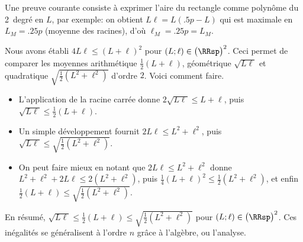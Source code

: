 

\begin{remark}
	Une preuve courante consiste à exprimer l'aire du rectangle comme polynôme du 2\ieme\ degré en $L$, par exemple: on obtient $L \ell = L (\num{.5} p - L)$ qui est maximale en $L_M = \num{.25} p$ (moyenne des racines), d'où $\ell_M = \num{.25} p = L_M$.
\end{remark}




\begin{remark} \label{ineq-geo-quad-arith}
	Nous avons établi
	$4 L \ell \leq (L + \ell)^2$
	pour $(L ; \ell) \in \big( \RRsp \big)^2$.
	Ceci permet de comparer les moyennes arithmétique $\frac12 (L + \ell)$, géométrique $\sqrt{L \ell}$ et quadratique $\sqrt{\frac12 (L^2 + \ell^2)}$ d'ordre $2$.
	Voici comment faire.
	\begin{itemize}
		\item L'application de la racine carrée donne
		$2 \sqrt{L \ell} \leq L + \ell$, puis 
		$\sqrt{L \ell} \leq \frac12 (L + \ell)$.
		
		\item Un simple développement fournit $2 L \ell \leq L^2 + \ell^2$, puis
    	$\sqrt{L \ell} \leq \sqrt{\frac12 (L^2 + \ell^2)}$.
		
		\item On peut faire mieux en notant que $2 L \ell \leq L^2 + \ell^2$ donne
		$L^2 + \ell^2 + 2 L \ell \leq 2 (L^2 + \ell^2)$, puis
		$\frac14 (L + \ell)^2 \leq \frac12 (L^2 + \ell^2)$, et enfin 
		$\frac12 (L + \ell) \leq \sqrt{\frac12 (L^2 + \ell^2)}$.
	\end{itemize}
	
	En résumé,
	$\sqrt{L \ell} \leq \frac12 (L + \ell) \leq \sqrt{\frac12 (L^2 + \ell^2)}$
	pour $(L ; \ell) \in \big( \RRsp \big)^2$.
	Ces inégalités se généralisent à l'ordre $n$ grâce à l'algèbre, ou l'analyse.
\end{remark}
